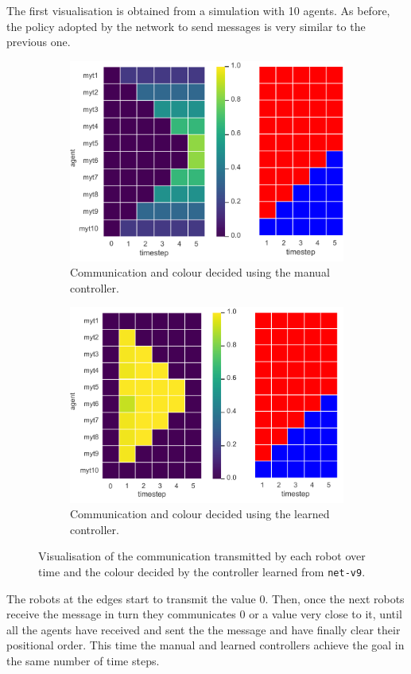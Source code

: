 The first visualisation is obtained from a simulation with 10 agents. 
As before, the policy adopted by the network to send messages is very similar to 
the previous one. 
\begin{figure}[!htb]
	\begin{subfigure}[h]{\textwidth}
		\centering
		\includegraphics[width=.6\textwidth]{contents/images/net-v9/net-v9-manual-0}
		\caption{Communication and colour decided using the manual controller.}
	\end{subfigure}
	\hspace*{\fill}%
	\vspace*{8pt}%
	\hspace*{\fill}%
	\begin{subfigure}[h]{\textwidth}
		\centering			
		\includegraphics[width=.6\textwidth]{contents/images/net-v9/net-v9-learned-0}
		\caption{Communication and colour decided using the learned controller.}
	\end{subfigure}
	\caption[Evaluation of the communication learned by 
	\texttt{net-v9}.]{Visualisation of the communication transmitted by each 
		robot over time and the colour decided by the controller learned from 
		\texttt{net-v9}.}	
	\label{fig:net-v9commcolour}
\end{figure}

\noindent
The robots at the edges start to transmit the value 0. Then, once 
the next robots receive the message in turn they communicates 0 or a value very 
close to it, until all the agents have received and sent the the message and have 
finally clear their positional order.
This time the manual and learned controllers achieve the goal in the same 
number of time steps.

